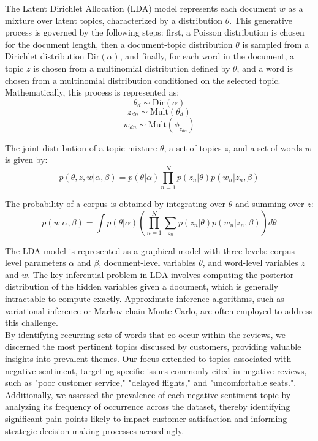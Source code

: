 \documentclass[11pt]{article} %
\begin{document}
The Latent Dirichlet Allocation (LDA) model represents each document \( w \) as a mixture over latent topics, characterized by a distribution \( \theta \). This generative process is governed by the following steps: first, a Poisson distribution is chosen for the document length, then a document-topic distribution \( \theta \) is sampled from a Dirichlet distribution \( \text{Dir}(\alpha) \), and finally, for each word in the document, a topic \( z \) is chosen from a multinomial distribution defined by \( \theta \), and a word is chosen from a multinomial distribution conditioned on the selected topic. Mathematically, this process is represented as:
\[
\theta_d \sim \text{Dir}(\alpha)
\]
\[
z_{dn} \sim \text{Mult}(\theta_d)
\]
\[
w_{dn} \sim \text{Mult}(\phi_{z_{dn}})
\]

The joint distribution of a topic mixture \( \theta \), a set of topics \( z \), and a set of words \( w \) is given by:
\[
p(\theta, z, w | \alpha, \beta) = p(\theta | \alpha) \prod_{n=1}^{N} p(z_n | \theta) p(w_n | z_n, \beta)
\]

The probability of a corpus is obtained by integrating over \( \theta \) and summing over \( z \):
\[
p(w | \alpha, \beta) = \int p(\theta | \alpha) \left( \prod_{n=1}^{N} \sum_{z_n} p(z_n | \theta) p(w_n | z_n, \beta) \right) d\theta
\]

The LDA model is represented as a graphical model with three levels: corpus-level parameters \( \alpha \) and \( \beta \), document-level variables \( \theta \), and word-level variables \( z \) and \( w \). The key inferential problem in LDA involves computing the posterior distribution of the hidden variables given a document, which is generally intractable to compute exactly. Approximate inference algorithms, such as variational inference or Markov chain Monte Carlo, are often employed to address this challenge.\\




By identifying recurring sets of words that co-occur within the reviews, we discerned the most pertinent topics discussed by customers, providing valuable insights into prevalent themes. Our focus extended to topics associated with negative sentiment, targeting specific issues commonly cited in negative reviews, such as "poor customer service," "delayed flights," and "uncomfortable seats.". Additionally, we assessed the prevalence of each negative sentiment topic by analyzing its frequency of occurrence across the dataset, thereby identifying significant pain points likely to impact customer satisfaction and informing strategic decision-making processes accordingly. \\
\end{document}

